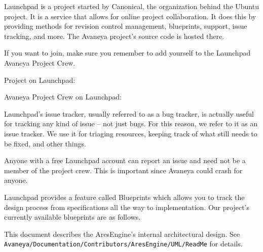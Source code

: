 

Launchpad is a project started by Canonical, the organization behind the Ubuntu project. It is a service that allows for online project collaboration. It does this by providing methods for revision control management, blueprints, support, issue tracking, and more. The Avaneya project's source code is hosted there.

If you want to join, make sure you remember to add yourself to the Launchpad Avaneya Project Crew.

\blank[2*big]
\startnarrower[3*left]
Project on Launchpad:\crlf
{}

\blank[2*big]
Avaneya Project Crew on Launchpad:\crlf
{}
\stopnarrower

Launchpad's issue tracker, usually referred to as a bug tracker, is actually useful for tracking any kind of issue -- not just bugs. For this reason, we refer to it as an issue tracker. We use it for triaging resources, keeping track of what still needs to be fixed, and other things. 

Anyone with a free Launchpad account can report an issue and need not be a member of the project crew. This is important since Avaneya could crash for anyone.

\startnarrower[3*left]
\stopnarrower

Launchpad provides a feature called Blueprints which allows you to track the design process from specifications all the way to implementation. Our project's currently available blueprints are as follows.

\startitemize[4]

This document describes the AresEngine's internal architectural design. See {\tt Avaneya/Documentation/Contributors/AresEngine/UML/ReadMe} for details.

\startnarrower[3*left]
\stopnarrower


